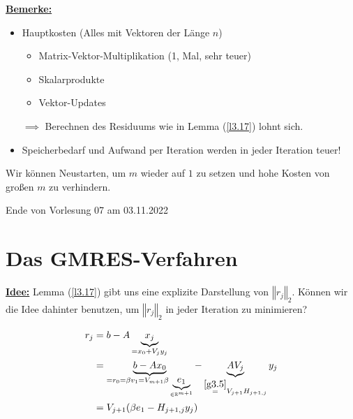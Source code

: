 \documentclass{book}
\def\R{\mathbb{R}}
\begin{document}
            \underline{\textbf{Bemerke:}}

                \begin{itemize}
                    \item Hauptkosten (Alles mit Vektoren der Länge \underline{$n$})
                        \begin{itemize}
                            \item Matrix-Vektor-Multiplikation (1, Mal, sehr teuer)
                            \item Skalarprodukte
                            \item Vektor-Updates
                        \end{itemize}
                    $\implies$ Berechnen des Residuums wie in Lemma (\ref{l3.17}) lohnt sich.
                    \item Speicherbedarf und Aufwand per Iteration werden in jeder Iteration teuer!
                \end{itemize}

            \begin{tcolorbox}[enhanced,breakable,
                title=Umgehen von großen $m$]
                Wir können Neustarten, um $m$ wieder auf $1$ zu setzen und hohe Kosten von großen $m$ zu verhindern.
            \end{tcolorbox}

            \noindent
            \xrfill[0.7ex]{1pt}Ende von Vorlesung 07 am 03.11.2022\xrfill[0.7ex]{1pt}

        \section{Das GMRES-Verfahren}

            \underline{\textbf{Idee:}} Lemma (\ref{l3.17}) gibt uns eine explizite Darstellung
            von $\left\Vert r_j \right\Vert_2$. Können wir die Idee dahinter benutzen, um $\left\Vert r_j \right\Vert_2$
            in jeder Iteration zu minimieren?


            \begin{align*}
                r_j&=b-A\underbrace{x_j}_{=x_0+V_jy_j}\\
                &= \underbrace{b-Ax_0}_{=r_0=\beta v_1=V_{m+1}\beta \underbrace{e_1}_{\in\R^{m+1}}}-\underbrace{AV_j}_{\stackrel{\ref{g3.5}}{=}V_{j+1}H_{j+1,j}}y_j\\
                &= V_{j+1}(\beta e_1-H_{j+1,j}y_j)
            \end{align*}
\end{document}

